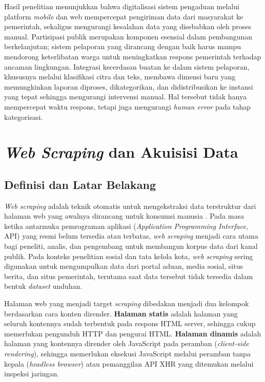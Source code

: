 Hasil penelitian \citet{firgiaImplementasiSistemInformasi2022} menunjukkan bahwa digitalisasi sistem pengaduan melalui platform \textit{mobile} dan web mempercepat pengiriman data dari masyarakat ke pemerintah, sekaligus mengurangi kesalahan data yang disebabkan oleh proses manual. Partisipasi publik merupakan komponen esensial dalam pembangunan berkelanjutan; sistem pelaporan yang dirancang dengan baik harus mampu mendorong keterlibatan warga untuk meningkatkan respons pemerintah terhadap ancaman lingkungan. Integrasi kecerdasan buatan ke dalam sistem pelaporan, khususnya melalui klasifikasi citra dan teks, membawa dimensi baru yang memungkinkan laporan diproses, dikategorikan, dan didistribusikan ke instansi yang tepat sehingga mengurangi intervensi manual. Hal tersebut tidak hanya mempercepat waktu respons, tetapi juga mengurangi \textit{human error} pada tahap kategorisasi.

\section{\textit{Web Scraping} dan Akuisisi Data}
\label{sec:webscraping}

\subsection{Definisi dan Latar Belakang}

\textit{Web scraping} adalah teknik otomatis untuk mengekstraksi data terstruktur dari halaman web yang awalnya dirancang untuk konsumsi manusia \citep{mitchellWebScraping2018}. Pada masa ketika antarmuka pemrograman aplikasi (\textit{Application Programming Interface}, API) yang resmi belum tersedia atau terbatas, \textit{web scraping} menjadi cara utama bagi peneliti, analis, dan pengembang untuk membangun korpus data dari kanal publik. Pada konteks penelitian sosial dan tata kelola kota, \textit{web scraping} sering digunakan untuk mengumpulkan data dari portal aduan, media sosial, situs berita, dan situs pemerintah, terutama saat data tersebut tidak tersedia dalam bentuk \textit{dataset} unduhan.

Halaman web yang menjadi target \textit{scraping} dibedakan menjadi dua kelompok berdasarkan cara konten dirender. \textbf{Halaman statis} adalah halaman yang seluruh kontennya sudah terbentuk pada respons HTML server, sehingga cukup memerlukan pengunduh HTTP dan pengurai HTML. \textbf{Halaman dinamis} adalah halaman yang kontennya dirender oleh JavaScript pada peramban (\textit{client-side rendering}), sehingga memerlukan eksekusi JavaScript melalui peramban tanpa kepala (\textit{headless browser}) atau pemanggilan API XHR yang ditemukan melalui inspeksi jaringan.

